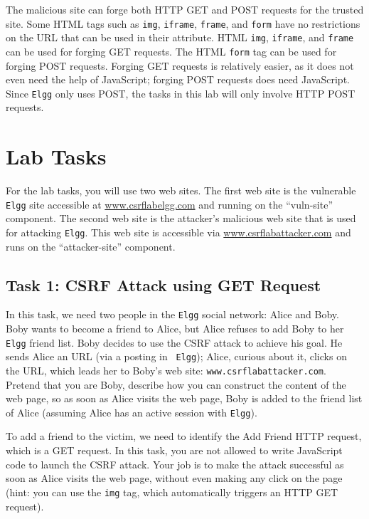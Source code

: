 The malicious site can forge both HTTP GET and POST requests for the
trusted site. Some HTML tags such as \texttt{img}, \texttt{iframe},
\texttt{frame}, and \texttt{form} have no restrictions on the URL that can
be used in their attribute. HTML \texttt{img}, \texttt{iframe}, and
\texttt{frame} can be used for forging GET requests. The HTML
\texttt{form} tag can be used for forging POST requests. 
Forging GET requests is relatively easier, as it does not even need 
the help of JavaScript; forging POST requests does need JavaScript. 
Since {\tt Elgg} only uses POST, the tasks in this lab will 
only involve HTTP POST requests.

\section{Lab Tasks}

For the lab tasks, you will use two web sites.
The first web site is the vulnerable \texttt{Elgg}
site accessible at \url{www.csrflabelgg.com} and running on the ``vuln-site''
component. The second
web site is the attacker's malicious web site that is used for
attacking {\tt Elgg}. This web site is accessible via
\url{www.csrflabattacker.com} and runs on the ``attacker-site'' component.


\subsection{Task 1: CSRF Attack using GET Request}

In this task, we need two people in the {\tt Elgg} social network: Alice
and Boby. Boby wants to become a friend to Alice, but Alice refuses to add 
Boby to her {\tt Elgg} friend list. Boby decides to use the CSRF attack to
achieve his goal. He sends Alice an URL (via a posting in {\tt
Elgg}); Alice, curious about it, clicks on the URL, which leads her to Boby's web site:    
{\tt www.csrflabattacker.com}. Pretend that you are Boby, describe how you
can construct the content of the web page, so as soon as Alice visits the
web page, Boby is added to the friend list of Alice (assuming Alice has an
active session with {\tt Elgg}).


To add a friend to the victim, we need to identify the Add Friend
HTTP request, which is a GET request. In this task, you are not allowed to
write JavaScript code to launch the CSRF attack. Your job is to make the
attack successful as soon as Alice visits the web page, without even making
any click on the page (hint: you can use the {\tt img} tag, which
automatically triggers an HTTP GET request).
 

